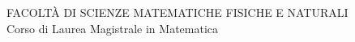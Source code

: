 \documentclass[12pt]{amsart}
\theoremstyle{definition}
\begin{document}
\begin{titlepage}
  \begin{center}
  \end{center}
\begin{center}
{\small{ FACOLT\`A DI SCIENZE MATEMATICHE FISICHE E NATURALI\\
Corso di Laurea Magistrale in Matematica}}
\end{center}
\vspace{20 mm}


\end{titlepage}
\end{document}

